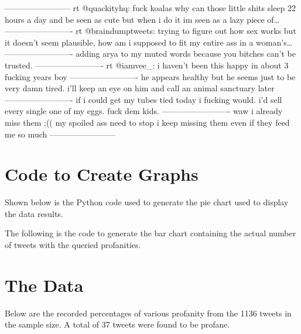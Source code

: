 \documentclass{article}
\begin{document}
\begin{flushleft}------------------------\newline
rt @quackityhq: fuck koalas why can those little shits sleep 22 hours a day and be seen as cute but when i do it im seen as a lazy piece of…\newline
-------------------------\newline
rt @braindumptweets: trying to figure out how sex works but it doesn't seem plausible, how am i supposed to fit my entire ass in a woman's…\newline
-------------------------\newline
adding arya to my muted words because you bitches can’t be trusted.\newline
-------------------------\newline
rt @iamvee\_: i haven’t been this happy in about 3 fucking years boy\newline
-------------------------\newline
he appears healthy but he seems just to be very damn tired. i'll keep an eye on him and call an animal sanctuary later\newline
-------------------------\newline
if i could get my tubes tied today i fucking would. i’d sell every single one of my eggs. fuck dem kids.\newline
-------------------------\newline
waw i already miss them ;(( my spoiled ass need to stop i keep missing them even if they feed me so much\newline
------------------------\newline
\end{flushleft}

\section{Code to Create Graphs}
\tab Shown below is the Python code used to generate the pie chart used to display the data results.\newline



The following is the code to generate the bar chart containing the actual number of tweets with the queried profanities.\newline



\section{The Data}
\tab Below are the recorded percentages of various profanity from the 1136 tweets in the sample size. A total of 37 tweets were found to be profane.
\end{document}
